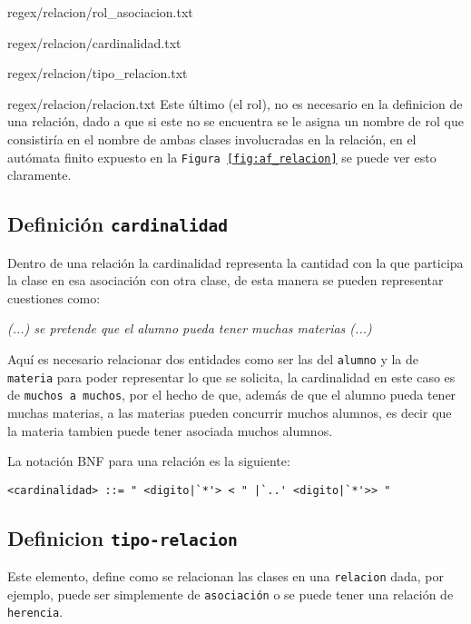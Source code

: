 \begin{lstinputlisting}[basicstyle=\footnotesize\ttfamily, caption={Regex -
  Nombre clase (+Rol) [Relación]},
  label=rerenomclase]{regex/relacion/rol_asociacion.txt}
\begin{lstinputlisting}[basicstyle=\footnotesize\ttfamily, caption={Regex -
  Cardinalidad [Relación]}, label=rerecard]{regex/relacion/cardinalidad.txt}
\begin{lstinputlisting}[basicstyle=\footnotesize\ttfamily, caption={Regex -
  Tipo de Relación [Relación]},
  label=reretiprel]{regex/relacion/tipo_relacion.txt}
\begin{lstinputlisting}[basicstyle=\footnotesize\ttfamily, caption={Regex -
  Relacion},
  label=rerelacion]{regex/relacion/relacion.txt}
Este último (el rol), no es necesario en la definicion de una relación, dado a
que si este no se encuentra se le asigna un nombre de rol que consistiría en el
nombre de ambas clases involucradas en la relación, en el autómata finito
expuesto en la \texttt{Figura \ref{fig:af_relacion}} se puede ver esto
claramente.

\subsection*{Definición \texttt{cardinalidad}}
\label{sub:cardinalidad}

Dentro de una relación la cardinalidad representa la cantidad con la que
participa la clase en esa asociación con otra clase, de esta manera se pueden
representar cuestiones como:

\begin{displayquote}
	\textit{(...) se pretende que el alumno pueda tener muchas materias (...)}
\end{displayquote}

Aquí es necesario relacionar dos entidades como ser las del \texttt{alumno} y
la de \texttt{materia} para poder representar lo que se solicita, la
cardinalidad en este caso es de \texttt{muchos a muchos}, por el hecho de que,
además de que el alumno pueda tener muchas materias, a las materias pueden
concurrir muchos alumnos, es decir que la materia tambien puede tener asociada
muchos alumnos.

La notación BNF para una relación es la siguiente:

\begin{lstlisting}[caption={BNF - Cardinalidad para una Relación},basicstyle=\footnotesize\ttfamily]
	<cardinalidad> ::= " <digito|`*'> < " |`..' <digito|`*'>> "
\end{lstlisting}

\subsection*{Definicion \texttt{tipo-relacion}}
\label{sub:tiporelacion}

Este elemento, define como se relacionan las clases en una \texttt{relacion}
dada, por ejemplo, puede ser simplemente de \texttt{asociación} o se puede
tener una relación de \texttt{herencia}.


\end{lstinputlisting}
\end{lstinputlisting}
\end{lstinputlisting}
\end{lstinputlisting}
